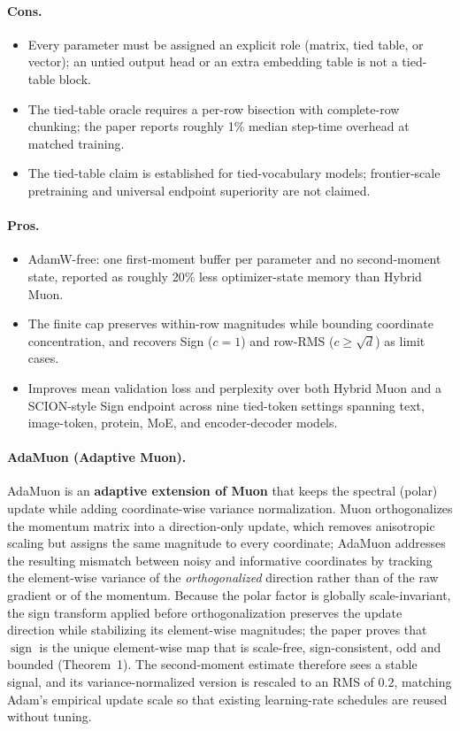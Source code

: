 \paragraph{Cons.}
\begin{itemize}[leftmargin=*]
\item Every parameter must be assigned an explicit role (matrix, tied table, or vector); an untied output head or an extra embedding table is not a tied-table block.
\item The tied-table oracle requires a per-row bisection with complete-row chunking; the paper reports roughly 1\% median step-time overhead at matched training.
\item The tied-table claim is established for tied-vocabulary models; frontier-scale pretraining and universal endpoint superiority are not claimed.
\end{itemize}

\paragraph{Pros.}
\begin{itemize}[leftmargin=*]
\item AdamW-free: one first-moment buffer per parameter and no second-moment state, reported as roughly 20\% less optimizer-state memory than Hybrid Muon.
\item The finite cap preserves within-row magnitudes while bounding coordinate concentration, and recovers Sign ($c=1$) and row-RMS ($c \geq \sqrt{d}$) as limit cases.
\item Improves mean validation loss and perplexity over both Hybrid Muon and a SCION-style Sign endpoint across nine tied-token settings spanning text, image-token, protein, MoE, and encoder-decoder models.
\end{itemize}

\paragraph{AdaMuon (Adaptive Muon).}
AdaMuon is an \textbf{adaptive extension of Muon} that keeps the spectral (polar) update while adding coordinate-wise variance normalization. Muon orthogonalizes the momentum matrix into a direction-only update, which removes anisotropic scaling but assigns the same magnitude to every coordinate; AdaMuon addresses the resulting mismatch between noisy and informative coordinates by tracking the element-wise variance of the \emph{orthogonalized} direction rather than of the raw gradient or of the momentum. Because the polar factor is globally scale-invariant, the sign transform applied before orthogonalization preserves the update direction while stabilizing its element-wise magnitudes; the paper proves that $\operatorname{sign}$ is the unique element-wise map that is scale-free, sign-consistent, odd and bounded (Theorem~1). The second-moment estimate therefore sees a stable signal, and its variance-normalized version is rescaled to an RMS of $0.2$, matching Adam's empirical update scale so that existing learning-rate schedules are reused without tuning.

